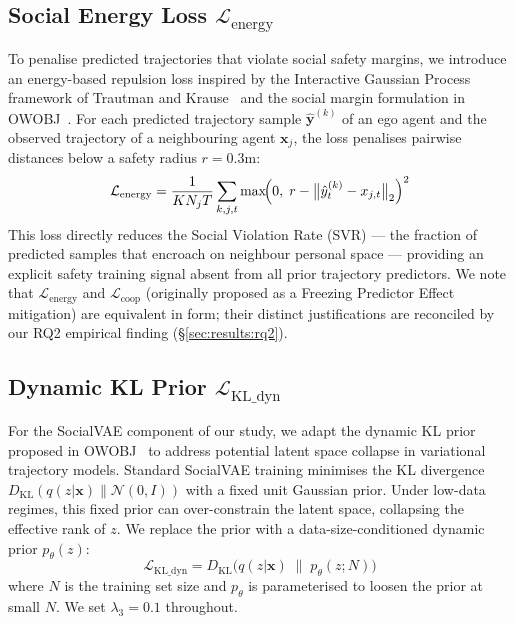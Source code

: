 \subsection{Social Energy Loss $\mathcal{L}_{\text{energy}}$}
\label{sec:method:energy}

To penalise predicted trajectories that violate social safety margins, we
introduce an energy-based repulsion loss inspired by the Interactive Gaussian
Process framework of Trautman and Krause~\cite{trautman2010iros} and the
social margin formulation in OWOBJ~\cite{zhang2025owobj}. For each predicted
trajectory sample $\hat{\mathbf{y}}^{(k)}$ of an ego agent and the observed
trajectory of a neighbouring agent $\mathbf{x}_j$, the loss penalises
pairwise distances below a safety radius $r = 0.3$m:
%
\begin{equation}
  \mathcal{L}_{\text{energy}} = \frac{1}{KN_j T}
  \sum_{k,j,t} \max\!\Bigl(0,\; r - \bigl\|\hat{y}^{(k)}_t - x_{j,t}\bigr\|_2\Bigr)^2
  \label{eq:lenergy}
\end{equation}
%
This loss directly reduces the Social Violation Rate (SVR) — the fraction of
predicted samples that encroach on neighbour personal space — providing an
explicit safety training signal absent from all prior trajectory predictors.
We note that $\mathcal{L}_{\text{energy}}$ and $\mathcal{L}_{\text{coop}}$
(originally proposed as a Freezing Predictor Effect mitigation) are equivalent
in form; their distinct justifications are reconciled by our RQ2 empirical
finding (§\ref{sec:results:rq2}).

\subsection{Dynamic KL Prior $\mathcal{L}_{\text{KL\_dyn}}$}
\label{sec:method:kl}

For the SocialVAE component of our study, we adapt the dynamic KL prior
proposed in OWOBJ~\cite{zhang2025owobj} to address potential latent space
collapse in variational trajectory models. Standard SocialVAE training
minimises the KL divergence $D_{\text{KL}}(q(z|\mathbf{x}) \| \mathcal{N}(0,I))$
with a fixed unit Gaussian prior. Under low-data regimes, this fixed prior
can over-constrain the latent space, collapsing the effective rank of $z$.
We replace the prior with a data-size-conditioned dynamic prior $p_\theta(z)$:
%
\begin{equation}
  \mathcal{L}_{\text{KL\_dyn}} = D_{\text{KL}}\!\bigl(q(z|\mathbf{x}) \;\|\; p_\theta(z; N)\bigr)
  \label{eq:lkl}
\end{equation}
%
where $N$ is the training set size and $p_\theta$ is parameterised to loosen
the prior at small $N$. We set $\lambda_3 = 0.1$ throughout.


